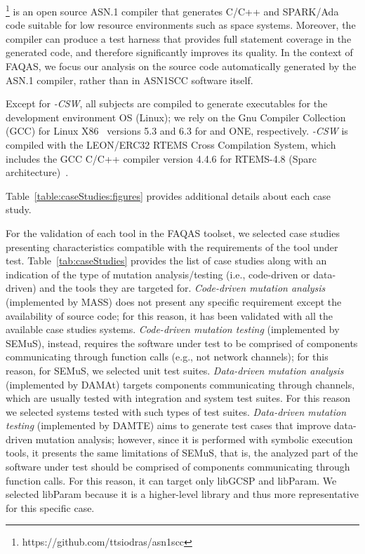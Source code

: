 \footnote{https://github.com/ttsiodras/asn1scc} is an open source ASN.1 compiler that generates C/C++ and SPARK/Ada code suitable for low resource environments such as space systems. Moreover, the compiler can produce a test harness that provides full statement coverage in the generated code, and therefore significantly improves its quality. In the context of FAQAS, we focus our analysis on the source code automatically generated by the ASN.1 compiler, rather than in ASN1SCC software itself. 

Except for \SAIL{}\emph{-CSW}, all subjects
are compiled to generate executables for the development environment OS (Linux); we rely on the Gnu Compiler Collection (GCC)  for Linux X86~\cite{GCC} versions 5.3 and 6.3 for \MLFS{}{} and ONE, respectively. \SAIL{}\emph{-CSW} is compiled with the
LEON/ERC32 RTEMS Cross Compilation System, which includes the GCC C/C++ compiler version 4.4.6 for  RTEMS-4.8 (Sparc architecture)~\cite{RTEMS}.



Table~\ref{table:caseStudies:figures} provides additional details about each case study.


For the validation of each tool in the FAQAS toolset, we selected case studies presenting characteristics compatible with the requirements of the tool under test. Table~\ref{tab:caseStudies} provides the list of case studies along with an indication of the type of mutation analysis/testing (i.e., code-driven or data-driven) and the tools they are targeted for.  \emph{Code-driven mutation analysis} (implemented by MASS) does not present any specific requirement except the availability of source code; for this reason, it has been validated with all the available case studies systems.
\emph{Code-driven mutation testing} (implemented by SEMuS), instead, requires the software under test to be comprised of components communicating through function calls (e.g., not network channels); for this reason, for SEMuS, we selected unit test suites.
\emph{Data-driven mutation analysis} (implemented by DAMAt) targets components communicating through channels, which are usually tested with integration and system test suites. For this reason we selected systems tested with such types of test suites.
\emph{Data-driven mutation testing} (implemented by DAMTE) aims to generate test cases that improve data-driven mutation analysis; however, since it is performed with symbolic execution tools, it presents the same limitations of SEMuS, that is, the analyzed part of the software under test should be comprised of components communicating through function calls. For this reason, it can target only libGCSP and libParam. We selected libParam because it is a higher-level library and thus more representative for this specific case.

